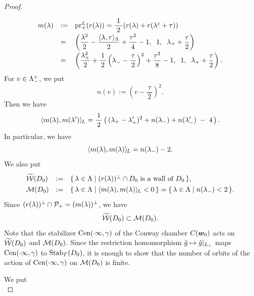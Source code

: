 \documentclass{amsart} %
\begin{document}
\begin{proof}
\begin{equation}
\renewcommand{\arraystretch}{2}
\begin{array}{lll}
m(\lambda) &:=& \prLplus(\LeechRoot{\lambda})=\dfrac{\;1\;}{2}(\LeechRoot{\lambda}+
\LeechRoot{\lambda^\vep+\tau})\\
&=&
\left(\dfrac{\lambda^2}{2}-\dfrac{\intfLeech{\lambda, \tau}}{2}+\dfrac{\tau^2}{4}-1, 
\;\; 1,\;\; \lambdaplus +\dfrac{\tau}{2}\right)\\
&=&
\left(
\dfrac{\lambdaplus^2}{2}+\dfrac{1}{\,2\,}\left(\lambdaminus-\dfrac{\tau}{\,2\,}\right)^2+\dfrac{\tau^2}{8}-1, 
\;\; 1,\;\; \lambdaplus +\dfrac{\tau}{2}\right).
\end{array}
\end{equation}
%
For $v\in \Lambda_{-}^{\vee}$,
we put
\[
n(v):=\left(v-\dfrac{\,\tau\,}{2}\right)^2.
\]
Then we have
%
\begin{equation}\label{eq:mlmlsprime}
 \langle m(\lambda), m(\lambda^{\prime}) \rangle_{\hskip -1pt L} =\frac{1}{\,2\,}
 \left(\,
({\lambda}_{+} - {\lambda}_{+}^{\prime} )^2
+
n({\lambda}_{-})
+
n({\lambda}_{-}^{\prime})
\;-\;4 
\,\right).
\end{equation}
%
In particular, we have 
%
\[
\langle m(\lambda), m(\lambda) \rangle_{\hskip -1pt L}=n({\lambda}_{-})-2.
\]
%
We also put 
\[
\renewcommand{\arraystretch}{1.3}
\begin{array}{lll}
\tilwalls(D_0) &:= & \set{\lambda\in \Leech}{\textrm{$(\LeechRoot{\lambda})\sperp \cap D_0$ is a wall of $D_0$}}, \\
\MMM(D_0) &:=& \set{\lambda\in \Leech}{\intfL{m(\lambda), m(\lambda)}<0}=\set{\lambda\in \Leech}{n(\lambdaminus)<2}.
\end{array}
\]
Since $(r(\lambda))^{\perp}\cap \mathord{\mathcal{P}}_{+}=(m(\lambda) )^{\perp}$,
we have 
%
\begin{equation}\label{eq:tilWWWMMM}
\widetilde{\mathord{\mathcal{W}}}(D_0)\subset \mathord{\mathcal{M}}(D_0).
\end{equation}
%
Note that  the stabilizer $\mathrm{Cen}(\cdot \infty, \gamma)$ of the Conway chamber $\mathord{C}(\boldsymbol{w}_0)$
acts on  
$\widetilde{\mathord{\mathcal{W}}}(D_0)$ and $\mathord{\mathcal{M}}(D_0)$.
Since the restriction homomorphism $\tilde{g}\mapsto \tilde{g}|_{L_{+}}$ maps  $\mathrm{Cen}(\cdot \infty, \gamma)$ to $\operatorname{Stab}_{\varGamma}(D_0)$, 
it  is enough to show that 
 the number of orbits of the action of $\mathrm{Cen}(\cdot \infty, \gamma)$ on $ \mathord{\mathcal{M}}(D_0)$
is finite.
\par
We put
%
\begin{equation}\label{eq:Xi}

\end{equation}
\end{proof}
\end{document}

